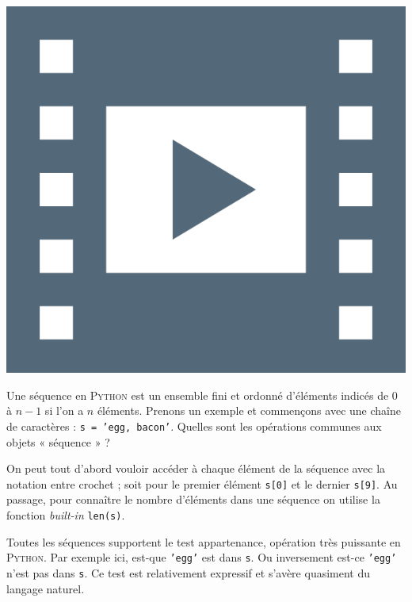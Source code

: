 \begin{marginvideo}
	[\label{vid:XI.4}Notion de séquence.]%
	\href{https://www.youtube.com/watch?v=F83A-t_nhAM&list=PL2CXLryTKuwwlCGfgpApOTmMn7_dbtwWa&index=5}%
	  {\includegraphics[width=\marginparwidth]{./Images/Pictograms/film-strip-dark-electric-blue.png}}%
\end{marginvideo}

Une séquence en \textsc{Python} est un ensemble fini et ordonné d'éléments indicés de $0$ à $n-1$ si l'on a $n$ éléments. Prenons un exemple et commençons avec une chaîne de caractères : \texttt{s = 'egg, bacon'}. Quel\-les sont les opérations communes aux objets « séquence » ?

On peut tout d'abord vouloir accéder à chaque élément de la séquence avec la notation entre crochet ; soit pour le premier élément \texttt{s[0]} et le dernier \texttt{s[9]}. Au passage, pour connaître le nombre d'éléments dans une séquence on utilise la fonction \textit{built-in} \texttt{len(s)}.

Toutes les séquences supportent le test appartenance, opération très puissante en \textsc{Python}. Par exemple ici, est-que \texttt{'egg'} est dans \texttt{s}. Ou inversement est-ce \texttt{'egg'} n'est pas dans \texttt{s}. Ce test est relativement expressif et s'avère quasiment du langage naturel.

